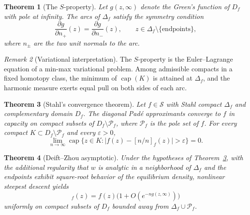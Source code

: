 \documentclass[11pt]{article}
\newtheorem{theorem}{Theorem}[section]
\theoremstyle{definition}
\theoremstyle{remark}
\newtheorem{remark}[theorem]{Remark}
\DeclareMathOperator{\capa}{cap}
\begin{document}
\begin{theorem}[The $S$-property]
\label{thm:s-property}
Let $g(z,\infty)$ denote the Green's function of $D_{f}$ with pole at infinity. The arcs of $\Delta_{f}$ satisfy the symmetry condition
\begin{equation}
\frac{\partial g}{\partial n_{+}}(z)=\frac{\partial g}{\partial n_{-}}(z),
\qquad z\in\Delta_{f}\setminus\{\text{endpoints}\},
\label{eq:s-property}
\end{equation}
where $n_{\pm}$ are the two unit normals to the arc.
\end{theorem}

\begin{remark}[Variational interpretation]
\label{rem:variational}
The $S$-property is the Euler--Lagrange equation of a min-max variational problem. Among admissible compacts in a fixed homotopy class, the minimum of $\capa(K)$ is attained at $\Delta_{f}$, and the harmonic measure exerts equal pull on both sides of each arc.
\end{remark}

\begin{theorem}[Stahl's convergence theorem]
\label{thm:stahl-convergence}
Let $f\in\mathcal{S}$ with Stahl compact $\Delta_{f}$ and complementary domain $D_{f}$. The diagonal Pad\'e approximants converge to $f$ in capacity on compact subsets of $D_{f}\setminus\mathcal{P}_{f}$, where $\mathcal{P}_{f}$ is the pole set of $f$. For every compact $K\subset D_{f}\setminus\mathcal{P}_{f}$ and every $\varepsilon>0$,
\begin{equation}
\lim_{n\to\infty}\capa\bigl\{z\in K:\bigl|f(z)-[n/n]_{f}(z)\bigr|>\varepsilon\bigr\}=0.
\label{eq:convergence-in-capacity}
\end{equation}
\end{theorem}

\begin{theorem}[Deift--Zhou asymptotic]
\label{thm:deift-zhou}
Under the hypotheses of Theorem~\ref{thm:stahl-convergence}, with the additional regularity that $w$ is analytic in a neighborhood of $\Delta_{f}$ and the endpoints exhibit square-root behavior of the equilibrium density, nonlinear steepest descent yields
\begin{equation}
[n/n]_{f}(z)=f(z)\bigl(1+O(e^{-ng(z,\infty)})\bigr)
\label{eq:deift-zhou-asymptotic}
\end{equation}
uniformly on compact subsets of $D_{f}$ bounded away from $\Delta_{f}\cup\mathcal{P}_{f}$.
\end{theorem}
\end{document}
